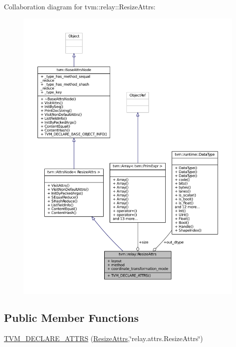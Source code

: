 Collaboration diagram for tvm\+:\+:relay\+:\+:Resize\+Attrs\+:
\nopagebreak
\begin{figure}[H]
\begin{center}
\leavevmode
\includegraphics[width=350pt]{structtvm_1_1relay_1_1ResizeAttrs__coll__graph}
\end{center}
\end{figure}
\subsection*{Public Member Functions}
\begin{DoxyCompactItemize}
\item 
\hyperlink{structtvm_1_1relay_1_1ResizeAttrs_a3d556241294f73ed462283192b8c0713}{T\+V\+M\+\_\+\+D\+E\+C\+L\+A\+R\+E\+\_\+\+A\+T\+T\+RS} (\hyperlink{structtvm_1_1relay_1_1ResizeAttrs}{Resize\+Attrs},\char`\"{}relay.\+attrs.\+Resize\+Attrs\char`\"{})
\end{DoxyCompactItemize}
